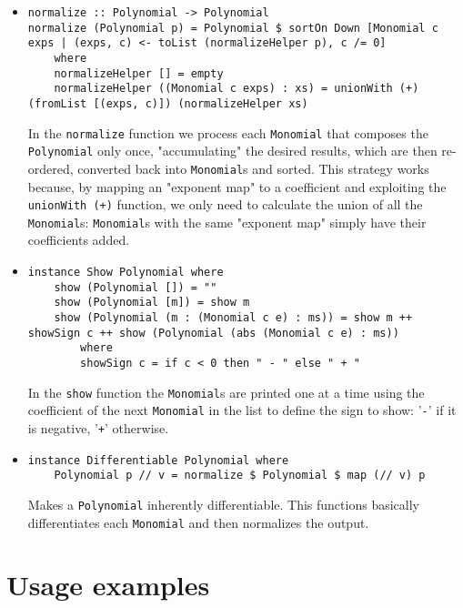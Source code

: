 \documentclass[11pt,a4paper]{article}
\begin{document}
\begin{itemize}
    \item \begin{lstlisting}
normalize :: Polynomial -> Polynomial
normalize (Polynomial p) = Polynomial $ sortOn Down [Monomial c exps | (exps, c) <- toList (normalizeHelper p), c /= 0]
    where
    normalizeHelper [] = empty
    normalizeHelper ((Monomial c exps) : xs) = unionWith (+) (fromList [(exps, c)]) (normalizeHelper xs)    
    \end{lstlisting}

          In the \lstinline{normalize} function we process each \lstinline{Monomial} that composes the \lstinline{Polynomial} only once, "accumulating" the desired results, which are then re-ordered, converted back into \lstinline{Monomial}s and sorted. This strategy works because, by mapping an "exponent map" to a coefficient and exploiting the \lstinline{unionWith (+)} function, we only need to calculate the union of all the \lstinline{Monomial}s: \lstinline{Monomial}s with the same "exponent map" simply have their coefficients added.

    \item \begin{lstlisting}
instance Show Polynomial where
    show (Polynomial []) = ""
    show (Polynomial [m]) = show m
    show (Polynomial (m : (Monomial c e) : ms)) = show m ++ showSign c ++ show (Polynomial (abs (Monomial c e) : ms))
        where
        showSign c = if c < 0 then " - " else " + "
    \end{lstlisting}

          In the \lstinline{show} function the \lstinline{Monomial}s are printed one at a time using the coefficient of the next \lstinline{Monomial} in the list to define the sign to show: '\lstinline{-}' if it is negative, '\lstinline{+}' otherwise.

    \item \begin{lstlisting}
instance Differentiable Polynomial where
    Polynomial p // v = normalize $ Polynomial $ map (// v) p
    \end{lstlisting}

          Makes a \lstinline{Polynomial} inherently differentiable. This functions basically differentiates each \lstinline{Monomial} and then normalizes the output.
\end{itemize}

\section{Usage examples}
\end{document}
